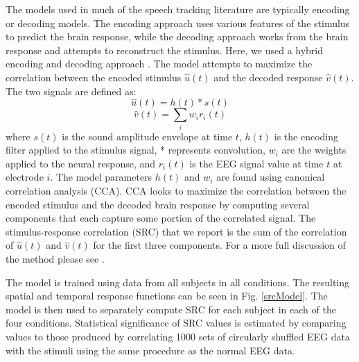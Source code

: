 \documentclass[10pt,letterpaper]{article}
\begin{document}
  The models used in much of the speech tracking literature 
  are typically encoding or 
  decoding models. The encoding approach uses various features of the 
  stimulus to predict the brain response, while the decoding approach works
  from the brain response and attempts to reconstruct the stimulus.
  Here, we used a 
  hybrid encoding and decoding approach \cite{Dmochowski2017}. The model 
  attempts to maximize the correlation between the encoded stimulus 
  $\hat{u}(t)$ and the decoded response $\hat{v}(t)$. The two signals 
  are defined as:
    $$\hat{u}(t) = h(t) * s(t)$$
    $$\hat{v}(t) = \sum_{i} w_ir_i(t)$$
  where $s(t)$ is the sound amplitude envelope at time $t$, $h(t)$ is the 
  encoding filter applied to the stimulus signal, * represents convolution, 
  $w_i$ are the weights applied to the neural response, and $r_i(t)$ is the 
  EEG signal value at time $t$ at electrode $i$. The model parameters 
  $h(t)$ and $w_i$ are found using canonical correlation analysis (CCA).
  CCA looks to maximize the correlation between the encoded stimulus and the 
  decoded brain response by computing several components that each capture
  some portion of the correlated signal. The stimulus-response correlation (SRC)
  that we report is the sum of the correlation of $\hat{u}(t)$ and $\hat{v}(t)$
  for the first three components. For a more full discussion of the method 
  please see \cite{Dmochowski2017}.

  The model is trained using data from all subjects in all conditions. 
  The resulting spatial and temporal response functions can be seen in 
  Fig. \ref{srcModel}. The model is then used to separately compute SRC for each 
  subject in each of the four conditions. Statistical significance of SRC 
  values is estimated by comparing values to those produced by 
  correlating 1000 sets of circularly shuffled EEG data with the stimuli using 
  the same procedure as the normal EEG data.
  


\end{document}
